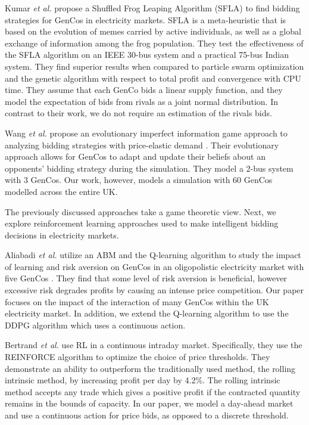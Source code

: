 \documentclass[conference]{IEEEtran}
\begin{document}
Kumar \textit{et al.} propose a Shuffled Frog Leaping Algorithm (SFLA) \cite{VijayaKumar2014} to find bidding strategies for GenCos in electricity markets. SFLA is a meta-heuristic that is based on the evolution of memes carried by active individuals, as well as a global exchange of information among the frog population. They test the effectiveness of the SFLA algorithm on an IEEE 30-bus system and a practical 75-bus Indian system. They find superior results when compared to particle swarm optimization and the genetic algorithm with respect to total profit and convergence with CPU time. They assume that each GenCo bids a linear supply function, and they model the expectation of bids from rivals as a joint normal distribution. In contrast to their work, we do not require an estimation of the rivals bids.

Wang \textit{et al.} propose an evolutionary imperfect information game approach to analyzing bidding strategies with price-elastic demand \cite{Wang2011}. Their evolutionary approach allows for GenCos to adapt and update their beliefs about an opponents' bidding strategy during the simulation. They model a 2-bus system with 3 GenCos. Our work, however, models a simulation with 60 GenCos modelled across the entire UK. 

The previously discussed approaches take a game theoretic view. Next, we explore reinforcement learning approaches used to make intelligent bidding decisions in electricity markets.


Aliabadi \textit{et al.} utilize an ABM and the Q-learning algorithm to study the impact of learning and risk aversion on GenCos in an oligopolistic electricity market with five GenCos \cite{EsmaeiliAliabadi2017}. They find that some level of risk aversion is beneficial, however excessive risk degrades profits by causing an intense price competition. Our paper focuses on the impact of the interaction of many GenCos within the UK electricity market. In addition, we extend the Q-learning algorithm to use the DDPG algorithm which uses a continuous action.

Bertrand \textit{et al.} use RL in a continuous intraday market. Specifically, they use the REINFORCE algorithm to optimize the choice of price thresholds. They demonstrate an ability to outperform the traditionally used method, the rolling intrinsic method, by increasing profit per day by 4.2\%. The rolling intrinsic method accepts any trade which gives a positive profit if the contracted quantity remains in the bounds of capacity. In our paper, we model a day-ahead market and use a continuous action for price bids, as opposed to a discrete threshold.
\end{document}
